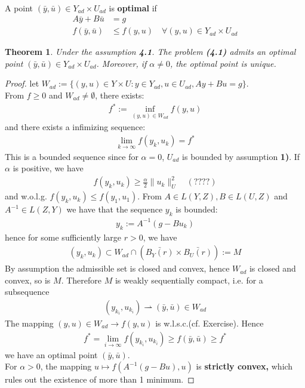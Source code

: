 \documentclass[a4paper,11pt,fleqn]{book}
\newtheorem{theorem}{Theorem}[section]
\theoremstyle{definition}
\theoremstyle{remark}
\begin{document}
\quad\\
A point $(\bar{y}, \bar{u}) \in Y_{ad} \times U_{ad}$ is \textbf{optimal} if 
\begin{align*}
	A\bar{y} + B \bar{u} &= g\\
	f(\bar{y}, \bar{u}) &\le f(y, u) \quad \forall (y, u) \in Y_{ad} \times U_{ad}
\end{align*}

\begin{theorem}
	Under the assumption \textbf{4.1}.  The problem \textbf{(4.1)} admits an optimal point $(\bar{y}, \bar{u}) \in Y_{ad} \times U_{ad}$. Moreover, if $\alpha \neq 0$, the optimal point is unique. 
\end{theorem}
\begin{proof}
	let $W_{ad} := \{(y, u) \in Y \times U: y \in Y_{ad}, u \in U_{ad}, Ay + Bu = g\}$. \\
	From $f \ge 0$ and $W_{ad} \neq \emptyset$, there exists:
	\begin{align*}
		f^*:= \inf_{(y, u) \in W_{ad}} f(y, u)
	\end{align*}
	and there exists a infimizing sequence:
	\begin{align*}
		\lim_{ k\rightarrow \infty} f(y_k, u_k) = f^*
	\end{align*}
	This is a bounded sequence since for $\alpha = 0$, $U_{ad}$ is bounded by assumption \textbf{1)}. If $\alpha$ is positive, we have 
	\begin{align*}
		f(y_k, u_k) \geq \frac{\alpha}{2}\|u_k\|_U^2\quad (????)
	\end{align*}
	and w.o.l.g. $f(y_k, u_k) \le f(y_1, u_1)$. From $A \in L(Y, Z), B \in L(U, Z)$ and $A^{-1} \in L(Z, Y)$ we have that the sequence $y_k$ is bounded:
	\begin{align*}
		y_k:= A^{-1}(g - Bu_k)
	\end{align*}
	hence for some sufficiently large $r > 0$, we have
	\begin{align*}
		(y_k, u_k) \subset W_{ad} \cap (\bar{B_Y(r)} \times \bar{B_U(r)}):= M
	\end{align*}
	By assumption the admissible set is closed and convex, hence $W_{ad}$ is closed and convex, so is $M$. Therefore $M$ is weakly sequentially compact, i.e. for a subsequence
	\begin{align*}
		(y_{k_i}, u_{k_i}) \rightharpoonup (\bar{y}, \bar{u}) \in W_{ad}
	\end{align*}
	The mapping $(y, u) \in W_{ad} \rightarrow f(y, u)$ is w.l.s.c.(cf. Exercise). Hence
	\begin{align*}
		f^* = \lim_{i \rightarrow \infty} f(y_{k_i}, u_{k_i}) \geq f(\bar{y}, \bar{u}) \geq f^*
	\end{align*}
	we have an optimal point $(\bar{y}, \bar{u})$. \\
	For $\alpha > 0$, the mapping $u \mapsto f(A^{-1}(g - Bu), u)$ is \textbf{strictly convex,} which rules out the existence of more than 1 minimum. 
\end{proof}
\end{document}
